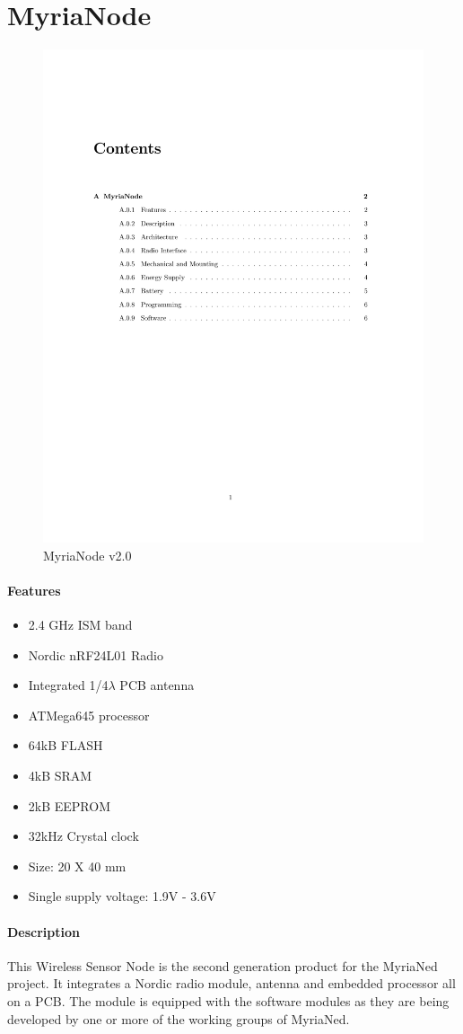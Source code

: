 \documentclass[a4paper,10pt]{report}
\begin{document}
\chapter{MyriaNode}
\begin{figure}[!h]
 \centering
\includegraphics[width=0.5 \textwidth]{myrianode}
\caption{MyriaNode v2.0}
\label{myrianode}
\end{figure}
\subsubsection{Features}
\begin{itemize}
 \item 2.4 GHz ISM band
 \item Nordic nRF24L01 Radio
 \item Integrated 1/4$\lambda$ PCB antenna
 \item ATMega645 processor
 \item 64kB FLASH
 \item 4kB SRAM
 \item 2kB EEPROM
 \item 32kHz Crystal clock
 \item Size: 20 X 40 mm
 \item Single supply voltage: 1.9V - 3.6V
\end{itemize}
\subsubsection{Description}
This Wireless Sensor Node is the second generation product for the MyriaNed project. It integrates a Nordic radio module, antenna and embedded processor all on a PCB. The module is equipped with the software modules as they are being developed by one or more of the working groups of MyriaNed.
\end{document}
